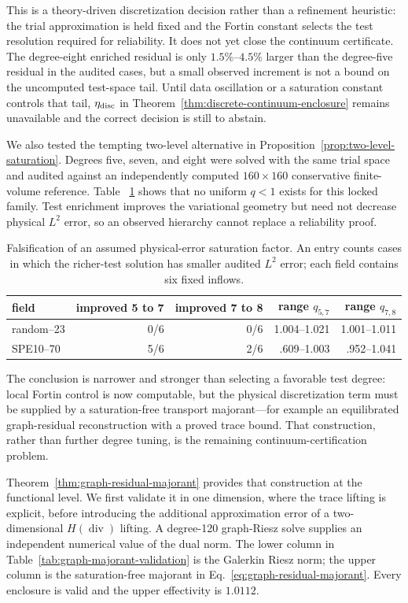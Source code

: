 \documentclass[11pt]{article}
\numberwithin{algorithm}{section}
\theoremstyle{definition}\newtheorem{definition}[theorem]{Definition}
\theoremstyle{remark}\newtheorem{remark}[theorem]{Remark}
\begin{document}
This is a theory-driven discretization decision rather than a refinement
heuristic: the trial approximation is held fixed and the Fortin constant
selects the test resolution required for reliability.  It does not yet close
the continuum certificate.  The degree-eight enriched residual is only
$1.5\%$--$4.5\%$ larger than the degree-five residual in the audited cases,
but a small observed increment is not a bound on the uncomputed test-space
tail.  Until data oscillation or a saturation constant controls that tail,
$\eta_{\rm disc}$ in Theorem~\ref{thm:discrete-continuum-enclosure} remains
unavailable and the correct decision is still to abstain.

We also tested the tempting two-level alternative in
Proposition~\ref{prop:two-level-saturation}.  Degrees five, seven, and eight
were solved with the same trial space and audited against an independently
computed $160\times160$ conservative finite-volume reference.  Table~
\ref{tab:saturation-audit} shows that no uniform $q<1$ exists for this locked
family.  Test enrichment improves the variational geometry but need not
decrease physical $L^2$ error, so an observed hierarchy cannot replace a
reliability proof.

\begin{table}[t]
\centering
\caption{Falsification of an assumed physical-error saturation factor.  An
entry counts cases in which the richer-test solution has smaller audited
$L^2$ error; each field contains six fixed inflows.}
\label{tab:saturation-audit}
\begin{tabular}{lrrrr}
\toprule
field & improved 5 to 7 & improved 7 to 8 & range $q_{5,7}$ & range $q_{7,8}$\\
\midrule
random--23 & 0/6 & 0/6 & 1.004--1.021 & 1.001--1.011\\
SPE10--70  & 5/6 & 2/6 & .609--1.003 & .952--1.041\\
\bottomrule
\end{tabular}
\end{table}

The conclusion is narrower and stronger than selecting a favorable test
degree: local Fortin control is now computable, but the physical
discretization term must be supplied by a saturation-free transport
majorant---for example an equilibrated graph-residual reconstruction with a
proved trace bound.  That construction, rather than further degree tuning, is
the remaining continuum-certification problem.

Theorem~\ref{thm:graph-residual-majorant} provides that construction at the
functional level.  We first validate it in one dimension, where the trace
lifting is explicit, before introducing the additional approximation error of
a two-dimensional $H(\operatorname{div})$ lifting.  A degree-120 graph-Riesz
solve supplies an independent numerical value of the dual norm.  The lower
column in Table~\ref{tab:graph-majorant-validation} is the Galerkin Riesz norm;
the upper column is the saturation-free majorant in
Eq.~\eqref{eq:graph-residual-majorant}.  Every enclosure is valid and the
upper effectivity is $1.0112$.
\end{document}
